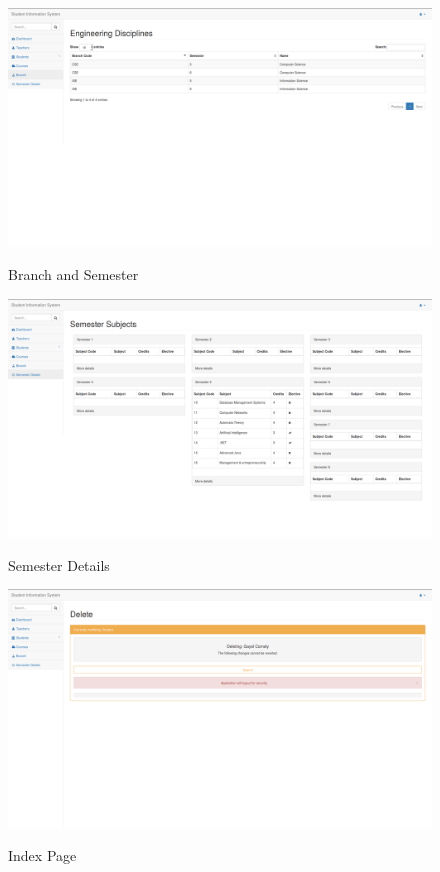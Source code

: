 \begin{figure}[H]
\centering
\caption{Branch and Semester}
\includegraphics[width=\textwidth,height=\textheight,keepaspectratio]{./snaps/9.png}
\\[0.2in]

\end{figure}

\begin{figure}[H]
\centering
\caption{Semester Details}
\includegraphics[width=\textwidth,height=\textheight,keepaspectratio]{./snaps/10.png}
\\[0.2in]
\label{fig:Semester Details}
\end{figure}

\begin{figure}[H]
\centering
\caption{Index Page}
\includegraphics[width=\textwidth,height=\textheight,keepaspectratio]{./snaps/11.png}
\\[0.2in]

\end{figure}

